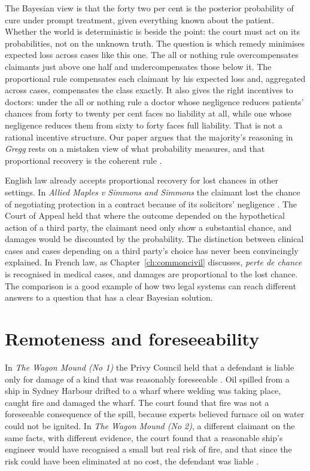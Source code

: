 The Bayesian view is that the forty two per cent is the posterior probability of cure under prompt treatment, given everything known about the patient. Whether the world is deterministic is beside the point: the court must act on its probabilities, not on the unknown truth. The question is which remedy minimises expected loss across cases like this one. The all or nothing rule overcompensates claimants just above one half and undercompensates those below it. The proportional rule compensates each claimant by his expected loss and, aggregated across cases, compensates the class exactly. It also gives the right incentives to doctors: under the all or nothing rule a doctor whose negligence reduces patients' chances from forty to twenty per cent faces no liability at all, while one whose negligence reduces them from sixty to forty faces full liability. That is not a rational incentive structure. Our paper argues that the majority's reasoning in \emph{Gregg} rests on a mistaken view of what probability measures, and that proportional recovery is the coherent rule \citep{polson_sokolov_tort}.

English law already accepts proportional recovery for lost chances in other settings. In \emph{Allied Maples v Simmons and Simmons} the claimant lost the chance of negotiating protection in a contract because of its solicitors' negligence \citep{alliedmaples1995}. The Court of Appeal held that where the outcome depended on the hypothetical action of a third party, the claimant need only show a substantial chance, and damages would be discounted by the probability. The distinction between clinical cases and cases depending on a third party's choice has never been convincingly explained. In French law, as Chapter~\ref{ch:commoncivil} discusses, \emph{perte de chance} is recognised in medical cases, and damages are proportional to the lost chance. The comparison is a good example of how two legal systems can reach different answers to a question that has a clear Bayesian solution.

\section{Remoteness and foreseeability}

In \emph{The Wagon Mound (No 1)} the Privy Council held that a defendant is liable only for damage of a kind that was reasonably foreseeable \citep{wagonmound1961}. Oil spilled from a ship in Sydney Harbour drifted to a wharf where welding was taking place, caught fire and damaged the wharf. The court found that fire was not a foreseeable consequence of the spill, because experts believed furnace oil on water could not be ignited. In \emph{The Wagon Mound (No 2)}, a different claimant on the same facts, with different evidence, the court found that a reasonable ship's engineer would have recognised a small but real risk of fire, and that since the risk could have been eliminated at no cost, the defendant was liable \citep{wagonmound1967}.

